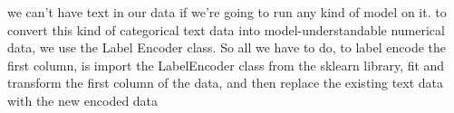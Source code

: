 \documentclass[preprint,12pt]{elsarticle}
\begin{document}
 we can’t have text in our data if we’re going to run any kind of model on it. to convert this kind of categorical text data into model-understandable numerical data, we use the Label Encoder class.
So all we have to do, to label encode the first column, is import the LabelEncoder class from the sklearn library, fit and transform the first column of the data, and then replace the existing text data with the new encoded data















\end{document}
